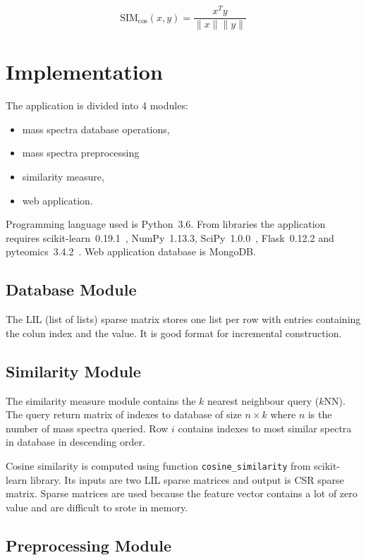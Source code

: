 \documentclass[a4paper,10pt,twocolumn]{article}
\begin{document}
\[ \text{SIM}_{\cos}(x, y) = \frac{x^Ty}{\|x\|\|y\|} \]

\section{Implementation}

The application is divided into 4 modules:

\begin{itemize}
    \item mass spectra database operations,
    \item mass spectra preprocessing
    \item similarity measure,
    \item web application.
\end{itemize}

Programming language used is Python~3.6. From libraries the application requires
scikit-learn~0.19.1~\cite{scikit-learn}, NumPy~1.13.3,
SciPy~1.0.0~\cite{scipy}, Flask~0.12.2 and
pyteomics~3.4.2~\cite{Goloborodko2013}. Web application database is MongoDB.

\subsection{Database Module}

The LIL (list of lists) sparse matrix stores one list per row with entries
containing the colun index and the value. It is good format for incremental
construction.

\subsection{Similarity Module}

The similarity measure module contains the \(k\) nearest neighbour query 
(\(k\)NN). The query return matrix of indexes to database of size
\(n \times k\) where \(n\) is the number of mass spectra queried.
Row \(i\) contains indexes to most similar spectra in database in
descending order.

Cosine similarity is computed using function \texttt{cosine\_similarity}
from scikit-learn library. Its inputs are two LIL sparse matrices and output
is CSR sparse matrix. Sparse matrices are used because the feature vector
contains a lot of zero value and are difficult to srote in memory.

\subsection{Preprocessing Module}
\end{document}
